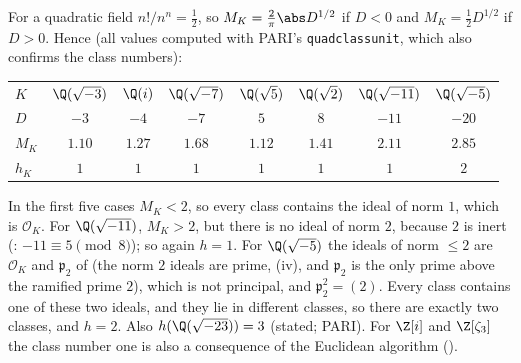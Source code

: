 \begin{example}\label{ex:ant:classnumbers}
For a quadratic field $n!/n^n=\frac12$, so $M_K=\frac2\pi\abs D^{1/2}$ if $D<0$ and $M_K=\frac12D^{1/2}$ if $D>0$. Hence (all values computed with PARI's
\texttt{quadclassunit}, which also confirms the class numbers):
\begin{center}\small
\begin{tabular}{lccccccc}
\toprule
$K$ & $\Q(\sqrt{-3})$ & $\Q(i)$ & $\Q(\sqrt{-7})$ & $\Q(\sqrt5)$ & $\Q(\sqrt2)$ & $\Q(\sqrt{-11})$ & $\Q(\sqrt{-5})$\\
$D$ & $-3$ & $-4$ & $-7$ & $5$ & $8$ & $-11$ & $-20$\\
$M_K$ & $1.10$ & $1.27$ & $1.68$ & $1.12$ & $1.41$ & $2.11$ & $2.85$\\
$h_K$ & $1$ & $1$ & $1$ & $1$ & $1$ & $1$ & $2$\\
\bottomrule
\end{tabular}
\end{center}
In the first five cases $M_K<2$, so every class contains the ideal of norm $1$, which is $\mathcal O_K$. For $\Q(\sqrt{-11})$, $M_K>2$, but there is
no ideal of norm $2$, because $2$ is inert (: $-11\equiv5\pmod8$); so again $h=1$. For $\Q(\sqrt{-5})$ the ideals of norm $\le2$ are
$\mathcal O_K$ and $\mathfrak p_2$ of  (the norm $2$ ideals are prime, (iv), and $\mathfrak p_2$ is the only
prime above the ramified prime $2$), which is not principal, and $\mathfrak p_2^2=(2)$. Every class contains one of these two ideals, and they lie in different
classes, so there are exactly two classes, and $h=2$. Also $h(\Q(\sqrt{-23}))=3$
(stated; PARI). For $\Z[i]$ and $\Z[\zeta_3]$ the class number one is also a consequence of the Euclidean algorithm ().
\end{example}

